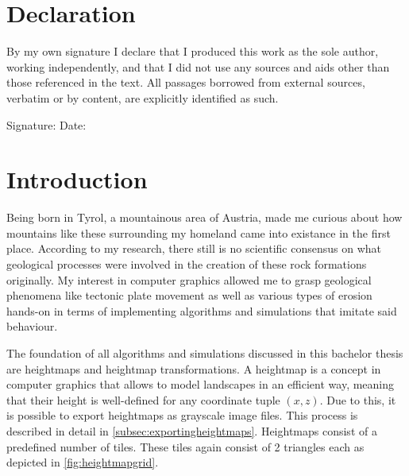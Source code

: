 \documentclass[11pt,a4paper,twoside,openright]{report}
\begin{document}

\tableofcontents
\listoffigures
\listoftables


\chapter*{Declaration}
By my own signature I declare that I produced this work as the sole author, working independently,
and that I did not use any sources and aids other than those referenced in the text.
All passages borrowed from external sources, verbatim or by content, are explicitly identified as
such.\\

\vspace{15mm}

\noindent Signature: \underline{\hspace{5cm}} \hspace{1cm}  Date: \underline{\hspace{5cm}}


\chapter{Introduction}
\label{sec:intro}

\pagestyle{fancy}

Being born in Tyrol, a mountainous area of Austria, made me curious about how mountains like these surrounding my homeland came into existance in the first place. According to my research, there still is no scientific consensus on what geological processes were involved in the creation of these rock formations originally. My interest in computer graphics allowed me to grasp geological phenomena like tectonic plate movement as well as various types of erosion hands-on in terms of implementing algorithms and simulations that imitate said behaviour.

The foundation of all algorithms and simulations discussed in this bachelor thesis are heightmaps and heightmap transformations. A heightmap is a concept in computer graphics that allows to model landscapes in an efficient way, meaning that their height is well-defined for any coordinate tuple $(x,z)$. Due to this, it is possible to export heightmaps as grayscale image files. This process is described in detail in \cref{subsec:exportingheightmaps}. Heightmaps consist of a predefined number of tiles. These tiles again consist of 2 triangles each as depicted in \cref{fig:heightmapgrid}.
\end{document}
